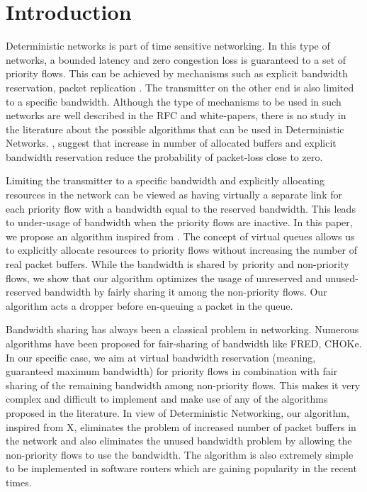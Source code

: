 \documentclass[10pt,sigconf,letterpaper,anonymous]{acmart}
\begin{document}
\section{Introduction}
Deterministic networks is part of time sensitive networking. In this type of networks, a bounded latency and zero congestion loss is guaranteed to a set of priority flows. This can be achieved by mechanisms such as explicit bandwidth reservation, packet replication \cite{detnetrfc}. The transmitter on the other end is also limited to a specific bandwidth. Although the type of mechanisms to be used in such networks are well described in the RFC and white-papers, there is no study in the literature about the possible algorithms that can be used in Deterministic Networks. \cite{detnetrfc}, \cite{detnetwhitepaper} suggest that increase in number of allocated buffers and explicit bandwidth reservation reduce the probability of packet-loss close to zero. 

Limiting the transmitter to a specific bandwidth and explicitly allocating resources in the network can be viewed as having virtually a separate link for each priority flow with a bandwidth equal to the reserved bandwidth. This leads to under-usage of bandwidth when the priority flows are inactive. In this paper, we propose an algorithm inspired from \cite{fairdroppaper}. The concept of virtual queues allows us to explicitly allocate resources to priority flows without increasing the number of real packet buffers. While the bandwidth is shared by priority and non-priority flows, we show that our algorithm optimizes the usage of unreserved and unused-reserved bandwidth by fairly sharing it among the non-priority flows. Our algorithm acts a dropper before en-queuing a packet in the queue.

Bandwidth sharing has always been a classical problem in networking. Numerous algorithms have been proposed for fair-sharing of bandwidth like FRED, CHOKe. In our specific case, we aim at virtual bandwidth reservation (meaning, guaranteed maximum bandwidth) for priority flows in combination with fair sharing of the remaining bandwidth among non-priority flows. This makes it very complex and difficult to implement and make use of any of the algorithms proposed in the literature.
In view of Deterministic Networking, our algorithm, inspired from X, eliminates the problem of increased number of packet buffers in the network and also eliminates the unused bandwidth problem by allowing the non-priority flows to use the bandwidth. The algorithm is also extremely simple to be implemented in software routers which are gaining popularity in the recent times.
\end{document}
